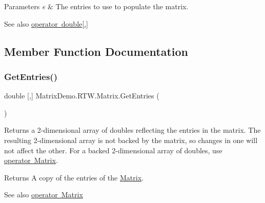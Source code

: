 \begin{DoxyParams}{Parameters}
{\em e} & The entries to use to populate the matrix.\\
\hline
\end{DoxyParams}
\begin{DoxySeeAlso}{See also}
\mbox{\hyperlink{class_matrix_demo_1_1_r_t_w_1_1_matrix_ac23641ac04b3c3baf14174bdf9049db2}{operator double\mbox{[},\mbox{]}}}


\end{DoxySeeAlso}


\subsection{Member Function Documentation}
\mbox{\label{class_matrix_demo_1_1_r_t_w_1_1_matrix_a9f6f8e0e7acfbdd55852f258daf68b8f}} 
\subsubsection{\texorpdfstring{Get\+Entries()}{GetEntries()}}
{\footnotesize\ttfamily double \mbox{[},\mbox{]} Matrix\+Demo.\+R\+T\+W.\+Matrix.\+Get\+Entries (\begin{DoxyParamCaption}{ }\end{DoxyParamCaption})}



Returns a 2-\/dimensional array of doubles reflecting the entries in the matrix. The resulting 2-\/dimensional array is not backed by the matrix, so changes in one will not affect the other. For a backed 2-\/dimensional array of doubles, use \mbox{\hyperlink{class_matrix_demo_1_1_r_t_w_1_1_matrix_a0c737f7e6b54edac4d26b4f1c595ee92}{operator Matrix}}. 

\begin{DoxyReturn}{Returns}
A copy of the entries of the \mbox{\hyperlink{class_matrix_demo_1_1_r_t_w_1_1_matrix}{Matrix}}.
\end{DoxyReturn}
\begin{DoxySeeAlso}{See also}
\mbox{\hyperlink{class_matrix_demo_1_1_r_t_w_1_1_matrix_a0c737f7e6b54edac4d26b4f1c595ee92}{operator Matrix}}


\end{DoxySeeAlso}
\mbox{\label{class_matrix_demo_1_1_r_t_w_1_1_matrix_ac23641ac04b3c3baf14174bdf9049db2}} 
